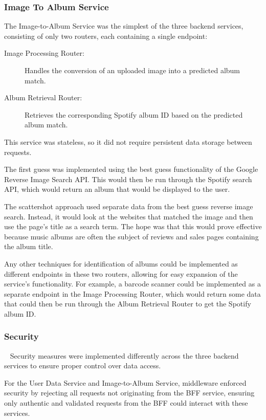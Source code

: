 \subsubsection{Image To Album Service}
The Image-to-Album Service was the simplest of the three backend services, consisting of only two routers, each containing a single endpoint:

\begin{description}
    \item[Image Processing Router:] Handles the conversion of an uploaded image into a predicted album match.
    \item[Album Retrieval Router:] Retrieves the corresponding Spotify album ID based on the predicted album match.
\end{description}

This service was stateless, so it did not require persistent data storage between requests.

The first guess was implemented using the best guess functionality of the Google Reverse Image Search API. This would then be run through the Spotify search API, which would return an album that would be displayed to the user.

The scattershot approach used separate data from the best guess reverse image search. Instead, it would look at the websites that matched the image and then use the page's title as a search term. The hope was that this would prove effective because music albums are often the subject of reviews and sales pages containing the album title.

Any other techniques for identification of albums could be implemented as different endpoints in these two routers, allowing for easy expansion of the service's functionality. For example, a barcode scanner could be implemented as a separate endpoint in the Image Processing Router, which would return some data that could then be run through the Album Retrieval Router to get the Spotify album ID.

\subsubsection{Security}~\label{sec:backend-security}
Security measures were implemented differently across the three backend services to ensure proper control over data access.

For the User Data Service and Image-to-Album Service, middleware enforced security by rejecting all requests not originating from the BFF service, ensuring only authentic and validated requests from the BFF could interact with these services.

